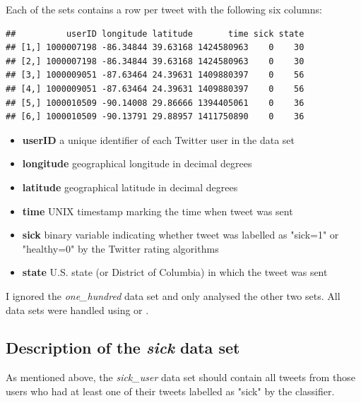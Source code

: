 \documentclass[11pt, a4paper]{article}\usepackage[]{graphicx}\usepackage[]{color}
\makeatletter
\newenvironment{kframe}{%
 \def\at@end@of@kframe{}%
 \ifinner\ifhmode%
  \def\at@end@of@kframe{\end{minipage}}%
  \begin{minipage}{\columnwidth}%
 \fi\fi%
 \def\FrameCommand##1{\hskip\@totalleftmargin \hskip-\fboxsep
 \colorbox{shadecolor}{##1}\hskip-\fboxsep
     \hskip-\linewidth \hskip-\@totalleftmargin \hskip\columnwidth}%
 \MakeFramed {\advance\hsize-\width
   \@totalleftmargin\z@ \linewidth\hsize
   \@setminipage}}%
 {\par\unskip\endMakeFramed%
 \at@end@of@kframe}
\newenvironment{knitrout}{}{} %
\makeatother
\begin{document}
Each of the sets contains a row per tweet with the following six columns: 

\begin{knitrout}
\color{fgcolor}\begin{kframe}
\begin{verbatim}
##          userID longitude latitude       time sick state
## [1,] 1000007198 -86.34844 39.63168 1424580963    0    30
## [2,] 1000007198 -86.34844 39.63168 1424580963    0    30
## [3,] 1000009051 -87.63464 24.39631 1409880397    0    56
## [4,] 1000009051 -87.63464 24.39631 1409880397    0    56
## [5,] 1000010509 -90.14008 29.86666 1394405061    0    36
## [6,] 1000010509 -90.13791 29.88957 1411750890    0    36
\end{verbatim}
\end{kframe}
\end{knitrout}

\begin{itemize}
  \item \textbf{userID} a unique identifier of each Twitter user in the data set
  \item \textbf{longitude} geographical longitude in decimal degrees
  \item \textbf{latitude} geographical latitude in decimal degrees
  \item \textbf{time} UNIX timestamp marking the time when tweet was sent
  \item \textbf{sick} binary variable indicating whether tweet was labelled as "sick=1" or "healthy=0" by the Twitter rating algorithms
  \item \textbf{state} U.S. state (or District of Columbia) in which the tweet was sent
\end{itemize}

I ignored the \textit{one\_hundred} data set and only analysed the other two sets. All data sets were handled using  or .

\subsection{Description of the \textit{sick} data set}
\label{sec:sick_user_exploratory}



As mentioned above, the \textit{sick\_user} data set should contain all tweets from those users who had at least one of their tweets labelled as "sick" by the classifier.\newline
\end{document}

